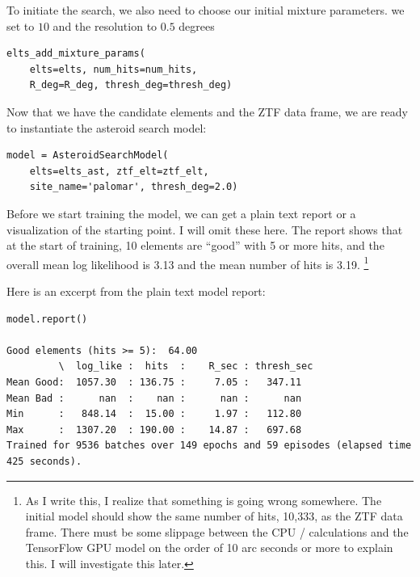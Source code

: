 To initiate the search, we also need to choose our initial mixture parameters.
we set  to $10$ and the resolution to $0.5$ degrees
\begin{lstlisting}[style=CodeSnippet]
elts_add_mixture_params(
	elts=elts, num_hits=num_hits, 
	R_deg=R_deg, thresh_deg=thresh_deg)
\end{lstlisting}

Now that we have the candidate elements and the ZTF data frame, we are ready to instantiate the asteroid search model:
\begin{lstlisting}[style=CodeSnippet]
model = AsteroidSearchModel(
	elts=elts_ast, ztf_elt=ztf_elt, 
	site_name='palomar', thresh_deg=2.0)
\end{lstlisting}
Before we start training the model, we can get a plain text report or a visualization of the starting point.
I will omit these here. 
The report shows that at the start of training, 10 elements are ``good'' with 5 or more hits,
and the overall mean log likelihood is 3.13 and the mean number of hits is 3.19.
\footnote{
As I write this, I realize that something is going wrong somewhere.
The initial model should show the same number of hits, 10,333, as the ZTF data frame.
There must be some slippage between the CPU /  calculations and the TensorFlow GPU model
on the order of 10 arc seconds or more to explain this.  I will investigate this later.}

\begin{minipage}{\linewidth}
Here is an excerpt from the plain text model report:
\begin{lstlisting}[style=CodeSnippet]
model.report()

Good elements (hits >= 5):  64.00
         \  log_like :  hits  :    R_sec : thresh_sec
Mean Good:  1057.30  : 136.75 :     7.05 :   347.11
Mean Bad :      nan  :    nan :      nan :      nan
Min      :   848.14  :  15.00 :     1.97 :   112.80
Max      :  1307.20  : 190.00 :    14.87 :   697.68
Trained for 9536 batches over 149 epochs and 59 episodes (elapsed time 425 seconds). 
\end{lstlisting}
\end{minipage}

